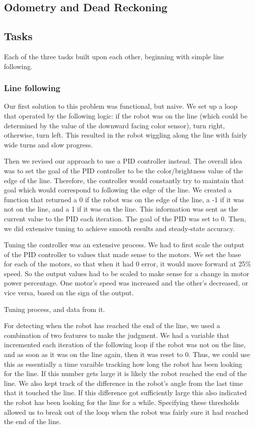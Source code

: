 \documentclass[12pt]{article}
\begin{document}
\subsection{Odometry and Dead Reckoning}

\subsection{Tasks}

Each of the three tasks built upon each other, beginning with simple line following.

\subsubsection{Line following}

Our first solution to this problem was functional, but naive. We set up a loop that operated by the following logic: if the robot was on the line (which could be determined by the value of the downward facing color sensor), turn right, otherwise, turn left. This resulted in the robot wiggling along the line with fairly wide turns and slow progress.

Then we revised our approach to use a PID controller instead. The overall idea was to set the goal of the PID controller to be the color/brightness value of the edge of the line. Therefore, the controller would constantly try to maintain that goal which would correspond to following the edge of the line. We created a function that returned a 0 if the robot was on the edge of the line, a -1 if it was not on the line, and a 1 if it was on the line. This information was sent as the current value to the PID each iteration. The goal of the PID was set to 0. Then, we did extensive tuning to achieve smooth results and steady-state accuracy.

Tuning the controller was an extensive process. We had to first scale the output of the PID controller to values that made sense to the motors. We set the base  for each of the motors, so that when it had 0 error, it would move forward at 25\% speed.  So the output values had to be scaled to make sense for a change in motor power percentage. One motor's speed was increased and the other's decreased, or vice versa, based on the sign of the output.

Tuning process, and data from it.

For detecting when the robot has reached the end of the line, we used a combination of two features to make the judgment. We had a variable that incremented each iteration of the following loop if the robot was not on the line, and as soon as it was on the line again, then it was reset to 0. Thus, we could use this as essentially a time varaible tracking how long the robot has been looking for the line. If this number gets large it is likely the robot reached the end of the line. We also kept track of the difference in the robot's angle from the last time that it touched the line. If this difference got sufficiently large this also indicated the robot has been looking for the line for a while. Specifying these thresholds allowed us to break out of the loop when the robot was fairly sure it had reached the end of the line.
\end{document}
